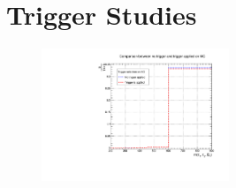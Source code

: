 \chapter{Trigger Studies}
\label{chap:TriggerStudies}

\begin{figure}[ht]
\begin{center}
\captionsetup[subfloat]{farskip=0pt,captionskip=0.0cm,labelformat=empty}
\includegraphics[clip,width=0.5\textwidth]{figuras/AppendiceA/trigger.pdf}
\end{center}
\end{figure}
